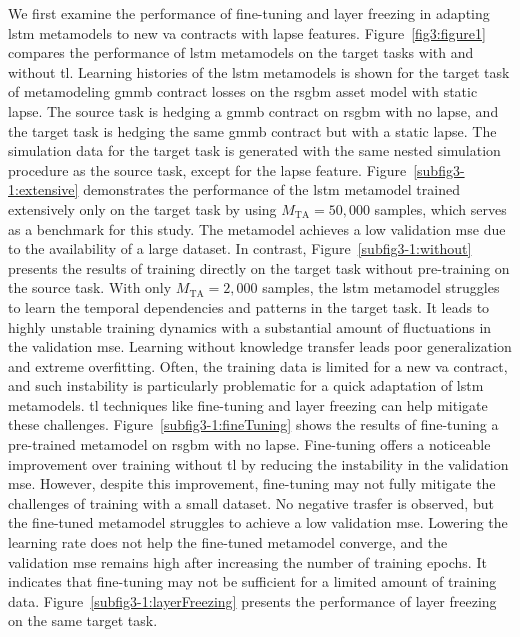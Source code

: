 We first examine the performance of fine-tuning and layer freezing in adapting \gls{lstm} metamodels to new \gls{va} contracts with lapse features.
Figure~\ref{fig3:figure1} compares the performance of \gls{lstm} metamodels on the target tasks with and without \gls{tl}.
Learning histories of the \gls{lstm} metamodels is shown for the target task of metamodeling \gls{gmmb} contract losses on the \gls{rsgbm} asset model with static lapse.
The source task is hedging a \gls{gmmb} contract on \gls{rsgbm} with no lapse, and the target task is hedging the same \gls{gmmb} contract but with a static lapse.
The simulation data for the target task is generated with the same nested simulation procedure as the source task, except for the lapse feature.
Figure~\ref{subfig3-1:extensive} demonstrates the performance of the \gls{lstm} metamodel trained extensively only on the target task by using $M_{\text{TA}} = 50,\!000$ samples, which serves as a benchmark for this study. 
The metamodel achieves a low validation \gls{mse} due to the availability of a large dataset.
In contrast, Figure~\ref{subfig3-1:without} presents the results of training directly on the target task without pre-training on the source task.
With only $M_{\text{TA}} = 2,\!000$ samples, the \gls{lstm} metamodel struggles to learn the temporal dependencies and patterns in the target task.
It leads to highly unstable training dynamics with a substantial amount of fluctuations in the validation \gls{mse}.
Learning without knowledge transfer leads poor generalization and extreme overfitting. 
Often, the training data is limited for a new \gls{va} contract, and such instability is particularly problematic for a quick adaptation of \gls{lstm} metamodels.
\gls{tl} techniques like fine-tuning and layer freezing can help mitigate these challenges.
Figure~\ref{subfig3-1:fineTuning} shows the results of fine-tuning a pre-trained metamodel on \gls{rsgbm} with no lapse.
Fine-tuning offers a noticeable improvement over training without \gls{tl} by reducing the instability in the validation \gls{mse}. 
However, despite this improvement, fine-tuning may not fully mitigate the challenges of training with a small dataset.
No negative trasfer is observed, but the fine-tuned metamodel struggles to achieve a low validation \gls{mse}.
Lowering the learning rate does not help the fine-tuned metamodel converge, and the validation \gls{mse} remains high after increasing the number of training epochs.
It indicates that fine-tuning may not be sufficient for a limited amount of training data.
Figure~\ref{subfig3-1:layerFreezing} presents the performance of layer freezing on the same target task.

